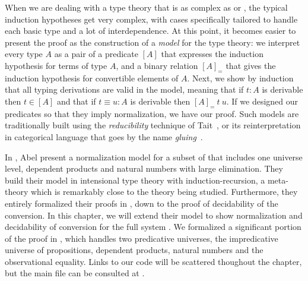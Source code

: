 When we are dealing with a type theory that is as complex as \MLTT or \SetoidCC, 
the typical induction hypotheses get very complex, with cases specifically 
tailored to handle each basic type and a lot of interdependence.
% 
At this point, it becomes easier to present the proof as the construction of
a \emph{model} for the type theory: we interpret every type \( A \) as a pair 
of a predicate \( [A] \) that expresses the induction hypothesis for terms of 
type \( A \), and a binary relation \( [A]_= \) that gives the induction 
hypothesis for convertible elements of \( A \).
% 
% 
Next, we show by induction that all typing derivations are valid in the model,
meaning that if \( t : A \) is derivable then \( t \in [A] \) and that if
\( t \equiv u : A \) is derivable then \( [A]_=\ t\ u \).
% 
If we designed our predicates so that they imply normalization, we have our 
proof.
% 
Such models are traditionally built using the \emph{reducibility} technique
of Tait~, or its reinterpretation in categorical language
that goes by the name \emph{gluing}~.

In , Abel \etal present a normalization model for a 
subset of \MLTT that includes one universe level, dependent products and 
natural numbers with large elimination.
% 
They build their model in intensional type theory with induction-recursion, 
a meta-theory which is remarkably close to the theory being studied.
% 
Furthermore, they entirely formalized their proofs in \Agda, down to the proof
of decidability of the conversion.
% 
In this chapter, we will extend their model to show normalization and decidability
of conversion for the full system \SetoidCC.
% 
We formalized a significant portion of the proof in \Agda, which handles two 
predicative universes, the impredicative universe of propositions, dependent 
products, natural numbers and the observational equality. 
% 
Links to our code will be scattered thoughout the chapter, but 
the main file can be consulted at .


